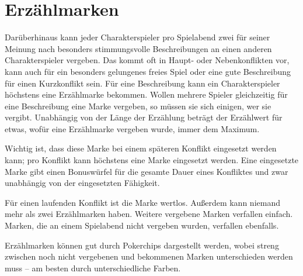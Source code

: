 \section{Erzählmarken}
Darüberhinaus kann jeder Charakterspieler pro Spielabend zwei  für seiner Meinung nach besonders stimmungsvolle Beschreibungen an einen anderen Charakterspieler vergeben. Das kommt oft in Haupt- oder Nebenkonflikten vor, kann auch für ein besonders gelungenes freies Spiel oder eine gute Beschreibung für einen Kurzkonflikt sein. Für eine Beschreibung kann ein Charakterspieler höchstens eine Erzählmarke bekommen. Wollen mehrere Spieler gleichzeitig für eine Beschreibung eine Marke vergeben, so müssen sie sich einigen, wer sie vergibt. Unabhängig von der Länge der Erzählung beträgt der Erzählwert für etwas, wofür eine Erzählmarke vergeben wurde, immer dem Maximum.

Wichtig ist, dass diese Marke bei einem späteren Konflikt eingesetzt werden kann; pro Konflikt kann höchstens eine Marke eingesetzt werden. Eine eingesetzte Marke gibt einen Bonuswürfel für die gesamte Dauer eines Konfliktes und zwar unabhängig von der eingesetzten Fähigkeit.

Für einen laufenden Konflikt ist die Marke wertlos. Außerdem kann niemand mehr als zwei Erzählmarken haben. Weitere vergebene Marken verfallen einfach. Marken, die an einem Spielabend nicht vergeben wurden, verfallen ebenfalls.

Erzählmarken können gut durch Pokerchips dargestellt werden, wobei streng zwischen noch nicht vergebenen und bekommenen Marken unterschieden werden muss -- am besten durch unterschiedliche Farben.


